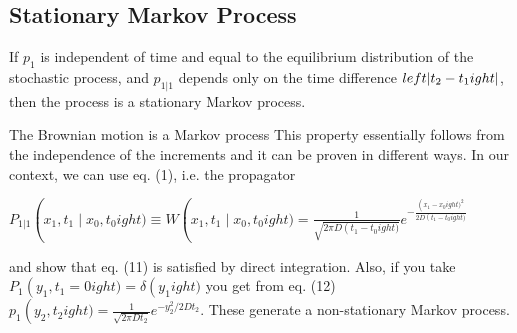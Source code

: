 \subsection*{Stationary Markov Process}
If $p_{1}$ is independent of time and equal to the equilibrium distribution of
the stochastic process, and $p_{1|1}$ depends only on the time difference
$\\left|t_{2}-t_{1}ight|$, then the process is a stationary Markov process.

The Brownian motion is a Markov process
This property essentially follows from the independence of the increments and it
can be proven in different ways. In our context, we can use eq. (1), i.e. the
propagator
\begin{DispWithArrows}[displaystyle, format=c]
  $P_{1|1}
  \left(x_{1}, t_{1}
  \mid x_{0}, t_{0}ight) \equiv W\left(x_{1}, t_{1}
  \mid x_{0}, t_{0}ight)=\frac{1}{\sqrt{2 \pi D\left(t_{1}-t_{0}ight)}} e^{-\frac{\left(x_{1}-x_{0}ight)^{2}}{2D\left(t_{1}-t_{0}ight)}}$
\end{DispWithArrows}
and show that eq. (11) is satisfied by direct integration. Also, if you take
$P_{1}
\left(y_{1}, t_{1}=0ight)=\delta\left(y_{1}ight)$ you get from eq. (12) $p_{1}
\left(y_{2}, t_{2}ight)=\frac{1}{\sqrt{2 \pi D t_{2}}} e^{-y_{2}^{2} / 2D t_{2}}$.
These generate a non-stationary Markov process.

